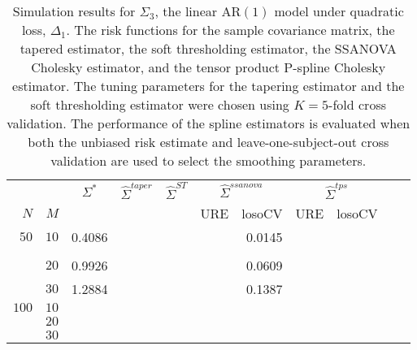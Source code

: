 \documentclass[12pt]{article}
\newcommand{\ra}[1]{\renewcommand{\arraystretch}{#1}}
\theoremstyle{definition}
\begin{document}
\begin{table}\centering
\ra{1.3}
\caption{Simulation results for $\Sigma_3$, the linear $\mbox{AR}\left(1\right)$ model under quadratic loss, $\Delta_1$. The risk functions for the sample covariance matrix, the tapered estimator, the soft thresholding estimator, the SSANOVA Cholesky estimator, and the tensor product P-spline Cholesky estimator. The tuning parameters for the tapering estimator and the soft thresholding estimator were chosen using $K = 5$-fold cross validation. The performance of the spline estimators is evaluated when both the unbiased risk estimate and leave-one-subject-out cross validation are used to select the smoothing parameters.}
\begin{tabular}{@{}rrrcrcrrcrr@{}}\toprule
   &            & \multicolumn{1}{c}{$\Sigma^*$}  & \multicolumn{1}{c}{$\hat{\Sigma}^{taper}$} &\multicolumn{1}{c}{$\hat{\Sigma}^{ST}$} &\multicolumn{2}{c}{ $\hat{\Sigma}^{ssanova}$} &  \multicolumn{2}{c}{ $\hat{\Sigma}^{tps}$}\\
$N$ & $M$ 	&	  &	& & \multicolumn{1}{c}{\mbox{URE}} & \multicolumn{1}{c}{\mbox{losoCV}} &\multicolumn{1}{c}{\mbox{URE}} & \multicolumn{1}{c}{\mbox{losoCV}}\\ \midrule
$50$ & $10$&0.4086 &&&&	   0.0145	&&\\\\
  & $20$  &0.9926 &&&&	0.0609  &&\\
  & $30$   & 1.2884 &&&&	0.1387 &&\\
$100$ & $10$ &&&&&&&\\
& $20$  &&&&&&& \\
& $30$  &&&&&&& \\
\bottomrule
\end{tabular}
\end{table}
\end{document}
